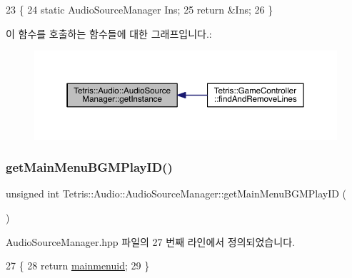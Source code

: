 \begin{DoxyCode}
23                                                     \{
24                 \textcolor{keyword}{static} AudioSourceManager Ins;
25                 \textcolor{keywordflow}{return} &Ins;
26             \}
\end{DoxyCode}
이 함수를 호출하는 함수들에 대한 그래프입니다.\+:
\nopagebreak
\begin{figure}[H]
\begin{center}
\leavevmode
\includegraphics[width=350pt]{d2/d6a/class_tetris_1_1_audio_1_1_audio_source_manager_a561c580924ee6a13e6453b2d94764548_icgraph}
\end{center}
\end{figure}
\mbox{\label{class_tetris_1_1_audio_1_1_audio_source_manager_a64d6e7c7f0849d5de7cc26898079986c}} 
\subsubsection{\texorpdfstring{get\+Main\+Menu\+B\+G\+M\+Play\+I\+D()}{getMainMenuBGMPlayID()}}
{\footnotesize\ttfamily unsigned int Tetris\+::\+Audio\+::\+Audio\+Source\+Manager\+::get\+Main\+Menu\+B\+G\+M\+Play\+ID (\begin{DoxyParamCaption}{ }\end{DoxyParamCaption})\hspace{0.3cm}{\ttfamily [inline]}}



Audio\+Source\+Manager.\+hpp 파일의 27 번째 라인에서 정의되었습니다.


\begin{DoxyCode}
27                                                \{
28                 \textcolor{keywordflow}{return} \hyperlink{class_tetris_1_1_audio_1_1_audio_source_manager_a6baf8cdd348f47e49ae2337eb9548fa0}{mainmenuid};
29             \}
\end{DoxyCode}
\mbox{\label{class_tetris_1_1_audio_1_1_audio_source_manager_a44c761f0200291a2c8f282d8d52aa081}} 
